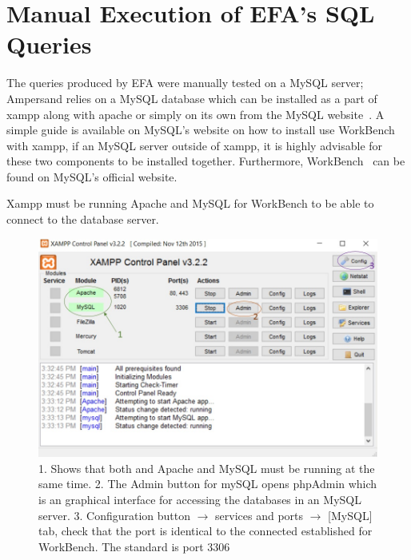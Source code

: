 \section{Manual Execution of EFA's SQL Queries}

The queries produced by EFA were manually tested on a MySQL server; Ampersand 
relies on a MySQL database which can be installed as a part of xampp along with 
apache or simply on its own from the MySQL website~\cite{MySQL-web}. A simple guide is 
available on MySQL's website on how to install use WorkBench with xampp, if an 
MySQL server outside of xampp, it is highly advisable for these two components 
to be installed together. Furthermore, WorkBench~\cite{workbench} can be found on 
MySQL's official website.

Xampp must be running Apache and MySQL for WorkBench to be able to connect to 
the database server. 
\begin{figure}[!h]
    \includegraphics[width=\textwidth]{images/xampp}
    \caption{\footnotesize{1. Shows that both and Apache and MySQL must be 
    running at the same time. 2. The Admin button for mySQL opens phpAdmin 
    which is an graphical interface for accessing the databases in an MySQL 
    server. 3. Configuration button $\rightarrow$ services and ports 
    $\rightarrow$ [MySQL] tab, check that the port is identical to the 
    connected established for WorkBench. The standard is port 3306 }}
\end{figure}

